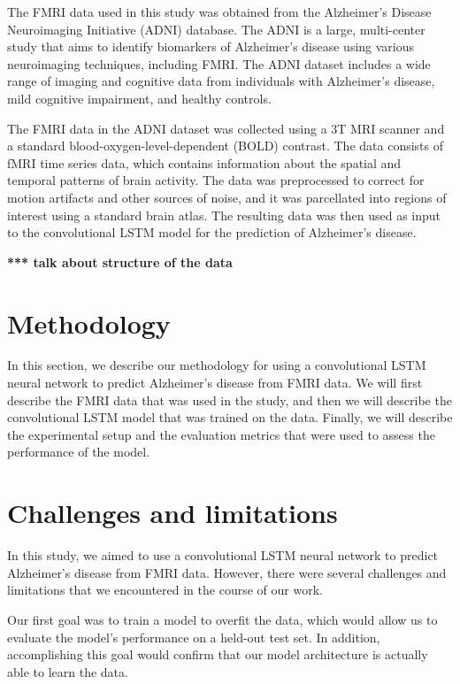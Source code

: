 \documentclass[10pt]{article}
\begin{document}
	The FMRI data used in this study was obtained from the Alzheimer's Disease Neuroimaging Initiative (ADNI) database. The ADNI is a large, multi-center study that aims to identify biomarkers of Alzheimer's disease using various neuroimaging techniques, including FMRI. The ADNI dataset includes a wide range of imaging and cognitive data from individuals with Alzheimer's disease, mild cognitive impairment, and healthy controls.

	The FMRI data in the ADNI dataset was collected using a 3T MRI scanner and a standard blood-oxygen-level-dependent (BOLD) contrast. The data consists of fMRI time series data, which contains information about the spatial and temporal patterns of brain activity. The data was preprocessed to correct for motion artifacts and other sources of noise, and it was parcellated into regions of interest using a standard brain atlas. The resulting data was then used as input to the convolutional LSTM model for the prediction of Alzheimer's disease.

	\textbf{*** talk about structure of the data}

	\section{Methodology}

	In this section, we describe our methodology for using a convolutional LSTM neural network to predict Alzheimer's disease from FMRI data. We will first describe the FMRI data that was used in the study, and then we will describe the convolutional LSTM model that was trained on the data. Finally, we will describe the experimental setup and the evaluation metrics that were used to assess the performance of the model.

	\section{Challenges and limitations}

	In this study, we aimed to use a convolutional LSTM neural network to predict Alzheimer's disease from FMRI data. However, there were several challenges and limitations that we encountered in the course of our work.

	Our first goal was to train a model to overfit the data, which would allow us to evaluate the model's performance on a held-out test set. In addition, accomplishing this goal would confirm that our model architecture is actually able to learn the data.
\end{document}
